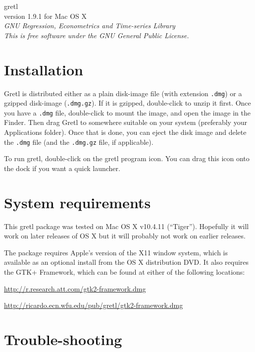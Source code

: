 \documentclass[11pt]{article}
\begin{document}
\begin{center}
{\color{gold} \titlefont gretl} \\[1ex]
version 1.9.1 for Mac OS X \\[2ex]

\textit{GNU Regression, Econometrics and Time-series Library\\
  This is free software under the GNU General Public License.}

\end{center}

\section{Installation}
\label{sec:install}

\textsf{Gretl} is distributed either as a plain disk-image file
(with extension \texttt{.dmg}) or a gzipped disk-image
(\texttt{.dmg.gz}).  If it is gzipped, double-click to unzip it
first.  Once you have a \texttt{.dmg} file, double-click to
mount the image, and open the image in the Finder.
Then drag \textsf{Gretl} to somewhere suitable on your
system (preferably your \textsf{Applications} folder).  Once that
is done, you can eject the disk image and delete the \texttt{.dmg}
file (and the \texttt{.dmg.gz} file, if applicable).

To run gretl, double-click on the gretl program icon.  You can drag
this icon onto the dock if you want a quick launcher.

\section{System requirements}
\label{sec:os}

This gretl package was tested on Mac OS X v10.4.11 (``Tiger'').  
Hopefully it will work on later releases of OS X but it will
probably not work on earlier releases.

The package requires Apple's version of the X11 window system, which
is available as an optional install from the OS X distribution DVD.
It also requires the GTK+ Framework, which can be found at either
of the following locations:

\url{http://r.research.att.com/gtk2-framework.dmg} 

\url{http://ricardo.ecn.wfu.edu/pub/gretl/gtk2-framework.dmg}

\section{Trouble-shooting}
\end{document}
